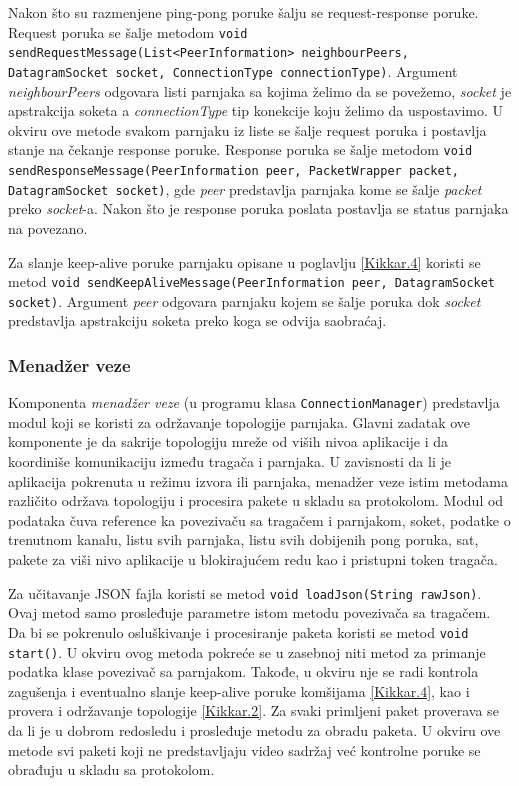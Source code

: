 \documentclass[12pt,oneside]{memoir}
\begin{document}
Nakon što su razmenjene ping-pong poruke šalju se request-response poruke. Request poruka se šalje metodom \texttt{void sendRequestMessage(List<PeerInformation> neighbourPeers, DatagramSocket socket, ConnectionType connectionType)}. Argument \textit{neighbourPeers} odgovara listi parnjaka sa kojima želimo da se povežemo, \textit{socket} je apstrakcija soketa a \textit{connectionType} tip konekcije koju želimo da uspostavimo. U okviru ove metode svakom parnjaku iz liste se šalje request poruka i postavlja stanje na čekanje response poruke. Response poruka se šalje metodom \texttt{void sendResponseMessage(PeerInformation peer, PacketWrapper packet, \\ DatagramSocket socket)}, gde \textit{peer} predstavlja parnjaka kome se šalje \textit{packet} preko \textit{socket}-a. Nakon što je response poruka poslata postavlja se status parnjaka na povezano.

Za slanje keep-alive poruke parnjaku opisane u poglavlju \ref{Kikkar.4} koristi se metod \texttt{void sendKeepAliveMessage(PeerInformation peer, DatagramSocket socket)}. Argument \textit{peer} odgovara parnjaku kojem se šalje poruka dok \textit{socket} predstavlja apstrakciju soketa preko koga se odvija saobraćaj.
			

\subsubsection{Menadžer veze}
\label{implementacija.2.3.3}

Komponenta \textit{menadžer veze} (u programu klasa \texttt{ConnectionManager}) predstavlja modul koji se koristi za održavanje topologije parnjaka. Glavni zadatak ove komponente je da sakrije topologiju mreže od viših nivoa aplikacije i da koordiniše komunikaciju između tragača i parnjaka. U zavisnosti da li je aplikacija pokrenuta u režimu izvora ili parnjaka, menadžer veze istim metodama različito održava topologiju i procesira pakete u skladu sa protokolom. Modul od podataka čuva reference ka povezivaču sa tragačem i parnjakom, soket, podatke o trenutnom kanalu, listu svih parnjaka, listu svih dobijenih pong poruka, sat, pakete za viši nivo aplikacije u blokirajućem redu kao i pristupni token tragača.

Za učitavanje JSON fajla koristi se metod \texttt{void loadJson(String rawJson)}. Ovaj metod samo prosleđuje parametre istom metodu povezivača sa tragačem. Da bi se pokrenulo osluškivanje i procesiranje paketa koristi se metod \texttt{void start()}. U okviru ovog metoda pokreće se u zasebnoj niti metod za primanje podatka klase povezivač sa parnjakom. Takođe, u okviru nje se radi kontrola zagušenja i eventualno slanje keep-alive poruke komšijama \ref{Kikkar.4}, kao i provera i održavanje topologije \ref{Kikkar.2}. Za svaki primljeni paket proverava se da li je u dobrom redosledu i prosleđuje metodu za obradu paketa. U okviru ove metode svi paketi koji ne predstavljaju video sadržaj već kontrolne poruke se obrađuju u skladu sa protokolom. 
\end{document}
